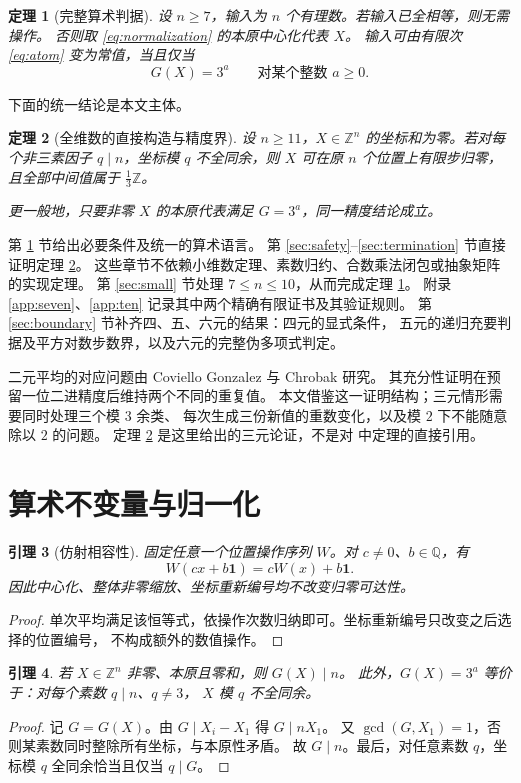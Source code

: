 \documentclass[UTF8,fontset=fandol,zihao=-4,a4paper]{ctexart}
\numberwithin{equation}{section}
\newtheorem{theorem}{定理}[section]
\newtheorem{lemma}[theorem]{引理}
\theoremstyle{definition}
\newcommand{\Z}{\mathbb Z}
\newcommand{\Q}{\mathbb Q}
\newcommand{\one}{\boldsymbol 1}
\begin{document}
\begin{theorem}[完整算术判据]\label{thm:main}
设 $n\ge7$，输入为 $n$ 个有理数。若输入已全相等，则无需操作。
否则取 \eqref{eq:normalization} 的本原中心化代表 $X$。
输入可由有限次 \eqref{eq:atom} 变为常值，当且仅当
\[
 G(X)=3^a\qquad\text{对某个整数 }a\ge0.
\]
\end{theorem}

下面的统一结论是本文主体。
\begin{theorem}[全维数的直接构造与精度界]\label{thm:uniform}
设 $n\ge11$，$X\in\Z^n$ 的坐标和为零。若对每个非三素因子
$q\mid n$，坐标模 $q$ 不全同余，则 $X$ 可在原 $n$ 个位置上有限步归零，
且全部中间值属于 $\frac13\Z$。

更一般地，只要非零 $X$ 的本原代表满足 $G=3^a$，同一精度结论成立。
\end{theorem}

第 \ref{sec:arithmetic} 节给出必要条件及统一的算术语言。
第 \ref{sec:safety}--\ref{sec:termination} 节直接证明定理 \ref{thm:uniform}。
这些章节不依赖小维数定理、素数归约、合数乘法闭包或抽象矩阵的实现定理。
第 \ref{sec:small} 节处理 $7\le n\le10$，从而完成定理 \ref{thm:main}。
附录 \ref{app:seven}、\ref{app:ten} 记录其中两个精确有限证书及其验证规则。
第 \ref{sec:boundary} 节补齐四、五、六元的结果：四元的显式条件，
五元的递归充要判据及平方对数步数界，以及六元的完整伪多项式判定。

二元平均的对应问题由 Coviello Gonzalez 与 Chrobak \cite{mixability} 研究。
其充分性证明在预留一位二进精度后维持两个不同的重复值。
本文借鉴这一证明结构；三元情形需要同时处理三个模 $3$ 余类、
每次生成三份新值的重数变化，以及模 $2$ 下不能随意除以 $2$ 的问题。
定理 \ref{thm:uniform} 是这里给出的三元论证，不是对 \cite{mixability} 中定理的直接引用。

\section{算术不变量与归一化}\label{sec:arithmetic}

\begin{lemma}[仿射相容性]\label{lem:affine-equivariance}
固定任意一个位置操作序列 $W$。对 $c\ne0$、$b\in\Q$，有
\[
 W(cx+b\one)=cW(x)+b\one.
\]
因此中心化、整体非零缩放、坐标重新编号均不改变归零可达性。
\end{lemma}
\begin{proof}
单次平均满足该恒等式，依操作次数归纳即可。坐标重新编号只改变之后选择的位置编号，
不构成额外的数值操作。
\end{proof}

\begin{lemma}\label{lem:G-divides-n}
若 $X\in\Z^n$ 非零、本原且零和，则 $G(X)\mid n$。
此外，$G(X)=3^a$ 等价于：对每个素数 $q\mid n$、$q\ne3$，
$X$ 模 $q$ 不全同余。
\end{lemma}
\begin{proof}
记 $G=G(X)$。由 $G\mid X_i-X_1$ 得 $G\mid nX_1$。
又 $\gcd(G,X_1)=1$，否则某素数同时整除所有坐标，与本原性矛盾。
故 $G\mid n$。最后，对任意素数 $q$，坐标模 $q$ 全同余恰当且仅当 $q\mid G$。
\end{proof}
\end{document}
